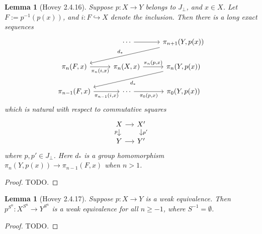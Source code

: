 \documentclass{amsart}
\theoremstyle{plain}
\newtheorem{lemma}[theorem]{Lemma}
\theoremstyle{definition}
\newcommand{\0}{\mathbf{0}}
\newcommand{\p}{{_\perp}}
\newcommand{\into}{\hookrightarrow}
\renewcommand{\(}{\left(}
\renewcommand{\)}{\right)}
\begin{document}
\begin{lemma}[Hovey 2.4.16]\label{2.4.16}
  Suppose $p:X\to Y$ belongs to $J\p$, and $x\in X$. Let $F:= p^{-1}(p(x))$, and $i:F\into X$ denote the inclusion. Then there is a long exact sequences
  \[\begin{tikzcd}
    & \cdots & {\pi_{n+1}(Y,p(x))} \\
    {\pi_n(F,x)} & {\pi_n(X,x)} & {\pi_n(Y,p(x))} \\
    {\pi_{n-1}(F,x)} & \cdots & {\pi_0(Y,p(x))}
    \arrow["{\pi_n(i,x)}"', from=2-1, to=2-2]
    \arrow["{\pi_n(p,x)}", from=2-2, to=2-3]
    \arrow["{d_\ast}", from=2-3, to=3-1]
    \arrow[from=1-2, to=1-3]
    \arrow["{d_\ast}"', from=1-3, to=2-1]
    \arrow["{\pi_{n-1}(i,x)}"', from=3-1, to=3-2]
    \arrow["{\pi_0(p,x)}"', from=3-2, to=3-3]
  \end{tikzcd}\]
  which is natural with respect to commutative squares
  \[\begin{tikzcd}[column sep=small,row sep=small]
    X & {X'} \\
    Y & {Y'}
    \arrow["{p'}", from=1-2, to=2-2]
    \arrow[from=1-1, to=1-2]
    \arrow["p"', from=1-1, to=2-1]
    \arrow[from=2-1, to=2-2]
  \end{tikzcd}\]
  where $p,p'\in J\p$. Here $d_\ast$ is a group homomorphism $\pi_n(Y,p(x))\to\pi_{n-1}(F,x)$ when $n>1$.
\end{lemma}
\begin{proof}
  \color{red}TODO.
\end{proof}

\begin{lemma}[Hovey 2.4.17]\label{2.4.17}
  Suppose $p:X\to Y$ is a weak equivalence. Then $p^{S^n}:X^{S^n}\to Y^{S^n}$ is a weak equivalence for all $n\geq-1$, where $S^{-1}=\emptyset$.
\end{lemma}
\begin{proof}
  \color{red}TODO.
\end{proof}
\end{document}
